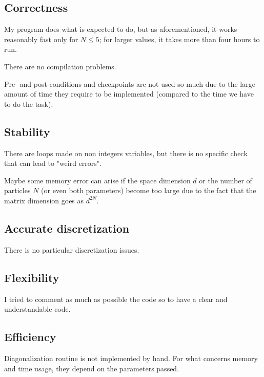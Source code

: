 \documentclass[12pt, a4paper, notitlepage]{report}
\begin{document}
\subsection*{Correctness}

My program does what is expected to do, but as aforementioned, it works reasonably fast only for $N \leq 5$; for larger values, it takes more than four hours to run.

There are no compilation problems.

Pre- and post-conditions and checkpoints are not used so much due to the large amount of time they require to be implemented (compared to the time we have to do the task).

\subsection*{Stability}

There are loops made on non integers variables, but there is no specific check that can lead to "weird errors".

Maybe some memory error can arise if the space dimension $d$ or the number of particles $N$ (or even both parameters) become too large due to the fact that the matrix dimension goes as $d^{2N}$.

\subsection*{Accurate discretization}

There is no particular discretization issues.

\subsection*{Flexibility}

I tried to comment as much as possible the code so to have a clear and understandable code.

\subsection*{Efficiency}

Diagonalization routine is not implemented by hand. For what concerns memory and time usage, they depend on the parameters passed.
\end{document}
